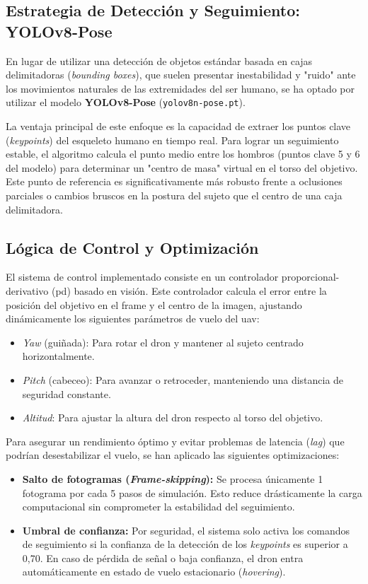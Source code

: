 \subsection{Estrategia de Detección y Seguimiento: YOLOv8-Pose}

En lugar de utilizar una detección de objetos estándar basada en cajas delimitadoras (\textit{bounding boxes}), que suelen presentar inestabilidad y "ruido" ante los movimientos naturales de las extremidades del ser humano, se ha optado por utilizar el modelo \textbf{YOLOv8-Pose} (\texttt{yolov8n-pose.pt}). 

La ventaja principal de este enfoque es la capacidad de extraer los puntos clave (\textit{keypoints}) del esqueleto humano en tiempo real. Para lograr un seguimiento estable, el algoritmo calcula el punto medio entre los hombros (puntos clave 5 y 6 del modelo) para determinar un "centro de masa" virtual en el torso del objetivo. Este punto de referencia es significativamente más robusto frente a oclusiones parciales o cambios bruscos en la postura del sujeto que el centro de una caja delimitadora.

\subsection{Lógica de Control y Optimización}

El sistema de control implementado consiste en un controlador proporcional-derivativo (\gls{pd}) basado en visión. Este controlador calcula el error entre la posición del objetivo en el frame y el centro de la imagen, ajustando dinámicamente los siguientes parámetros de vuelo del \gls{uav}:
\begin{itemize}
    \item \textit{Yaw} (guiñada): Para rotar el dron y mantener al sujeto centrado horizontalmente.
    \item \textit{Pitch} (cabeceo): Para avanzar o retroceder, manteniendo una distancia de seguridad constante.
    \item \textit{Altitud}: Para ajustar la altura del dron respecto al torso del objetivo.
\end{itemize}

Para asegurar un rendimiento óptimo y evitar problemas de latencia (\textit{lag}) que podrían desestabilizar el vuelo, se han aplicado las siguientes optimizaciones:
\begin{itemize}
    \item \textbf{Salto de fotogramas (\textit{Frame-skipping}):} Se procesa únicamente 1 fotograma por cada 5 pasos de simulación. Esto reduce drásticamente la carga computacional sin comprometer la estabilidad del seguimiento.
    \item \textbf{Umbral de confianza:} Por seguridad, el sistema solo activa los comandos de seguimiento si la confianza de la detección de los \textit{keypoints} es superior a 0,70. En caso de pérdida de señal o baja confianza, el dron entra automáticamente en estado de vuelo estacionario (\textit{hovering}).
\end{itemize}

